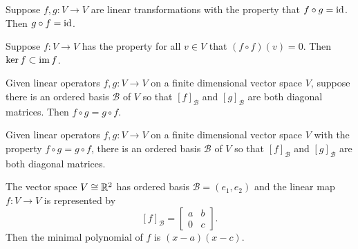 \documentclass{homework}
\begin{document}
\begin{problem}
  Suppose $f, g: V \to V$ are linear transformations with the property that $f \circ g = \operatorname{id}$.  Then $g \circ f = \operatorname{id}$.
\end{problem}

\begin{problem}
  Suppose $f : V \to V$ has the property for all $v \in V$ that $(f \circ f)(v) = 0$.  Then $\ker f \subset \operatorname{im} f$.
\end{problem}

\begin{problem}
  Given linear operators $f, g : V \to V$ on a finite dimensional vector space $V$, suppose there is an ordered basis $\mathcal{B}$ of $V$ so that $[f]_{\mathcal{B}}$ and $[g]_{\mathcal{B}}$ are both diagonal matrices.  Then $f \circ g = g \circ f$.
\end{problem}

\begin{problem}
  Given linear operators $f, g : V \to V$ on a finite dimensional
  vector space $V$ with the property $f \circ g = g \circ f$, there is
  an ordered basis $\mathcal{B}$ of $V$ so that $[f]_{\mathcal{B}}$
  and $[g]_{\mathcal{B}}$ are both diagonal matrices.
\end{problem}

\begin{problem}
  The vector space $V \cong \mathbb{R}^2$ has ordered basis $\mathcal{B} = (e_1,e_2)$ and the linear map $f : V \to V$ is represented by
  \[
    [f]_{\mathcal{B}} = \begin{bmatrix} a & b \\ 0 & c \end{bmatrix}.
  \]
  Then the minimal polynomial of $f$ is $(x-a)(x-c)$.
\end{problem}
\end{document}
